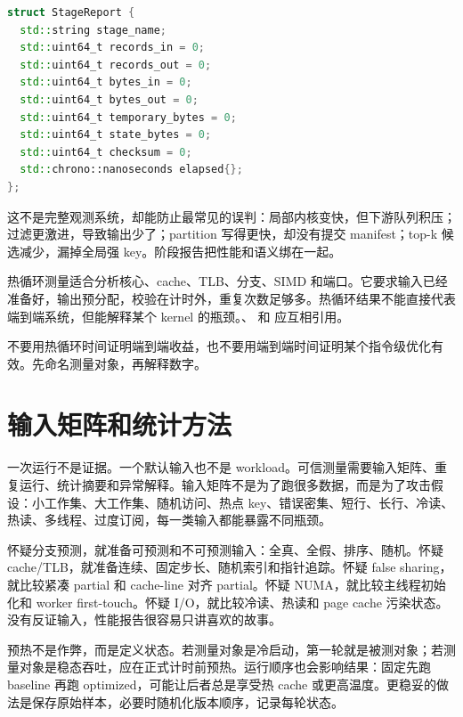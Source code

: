 \begin{lstlisting}[language=C++,caption={阶段报告的最小字段}]
struct StageReport {
  std::string stage_name;
  std::uint64_t records_in = 0;
  std::uint64_t records_out = 0;
  std::uint64_t bytes_in = 0;
  std::uint64_t bytes_out = 0;
  std::uint64_t temporary_bytes = 0;
  std::uint64_t state_bytes = 0;
  std::uint64_t checksum = 0;
  std::chrono::nanoseconds elapsed{};
};
\end{lstlisting}

这不是完整观测系统，却能防止最常见的误判：局部内核变快，但下游队列积压；过滤更激进，导致输出少了；partition 写得更快，却没有提交 manifest；top-k 候选减少，漏掉全局强 key。阶段报告把性能和语义绑在一起。

热循环测量适合分析核心、cache、TLB、分支、SIMD 和端口。它要求输入已经准备好，输出预分配，校验在计时外，重复次数足够多。热循环结果不能直接代表端到端系统，但能解释某个 kernel 的瓶颈。、 和  应互相引用。

\begin{warningbox}
不要用热循环时间证明端到端收益，也不要用端到端时间证明某个指令级优化有效。先命名测量对象，再解释数字。
\end{warningbox}

\section{输入矩阵和统计方法}

一次运行不是证据。一个默认输入也不是 workload。可信测量需要输入矩阵、重复运行、统计摘要和异常解释。输入矩阵不是为了跑很多数据，而是为了攻击假设：小工作集、大工作集、随机访问、热点 key、错误密集、短行、长行、冷读、热读、多线程、过度订阅，每一类输入都能暴露不同瓶颈。

怀疑分支预测，就准备可预测和不可预测输入：全真、全假、排序、随机。怀疑 cache/TLB，就准备连续、固定步长、随机索引和指针追踪。怀疑 false sharing，就比较紧凑 partial 和 cache-line 对齐 partial。怀疑 NUMA，就比较主线程初始化和 worker first-touch。怀疑 I/O，就比较冷读、热读和 page cache 污染状态。没有反证输入，性能报告很容易只讲喜欢的故事。

预热不是作弊，而是定义状态。若测量对象是冷启动，第一轮就是被测对象；若测量对象是稳态吞吐，应在正式计时前预热。运行顺序也会影响结果：固定先跑 baseline 再跑 optimized，可能让后者总是享受热 cache 或更高温度。更稳妥的做法是保存原始样本，必要时随机化版本顺序，记录每轮状态。

